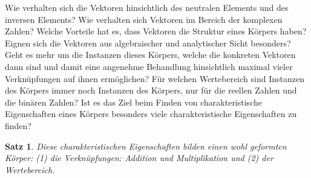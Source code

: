\documentclass{report}
\newtheorem{satz}{Satz}[section]
\numberwithin{equation}{section}
\begin{document}
Wie verhalten sich die Vektoren hinsichtlich des neutralen Elements und des inversen Elements? Wie verhalten sich Vektoren im Bereich der komplexen Zahlen? Welche Vorteile hat es, dass Vektoren die Struktur eines Körpers haben? Eignen sich die Vektoren aus algebraischer und analytischer Sicht besonders? Geht es mehr um die Instanzen dieses Körpers, welche die konkreten Vektoren dann sind und damit eine angenehme Behandlung hinsichtlich maximal vieler Verknüpfungen auf ihnen ermöglichen? Für welchen Wertebereich sind Instanzen des Körpers immer noch Instanzen des Körpers, nur für die reellen Zahlen und die binären Zahlen? Ist es das Ziel beim Finden von charakteristische Eigenschaften eines Körpers besonders viele charakteristische Eigenschaften zu finden? 
\begin{satz}
	Diese charakteristischen Eigenschaften bilden einen wohl geformten Körper: (1) die Verknüpfungen: Addition und Multiplikation und (2) der Wertebereich.
\end{satz}
\end{document}
